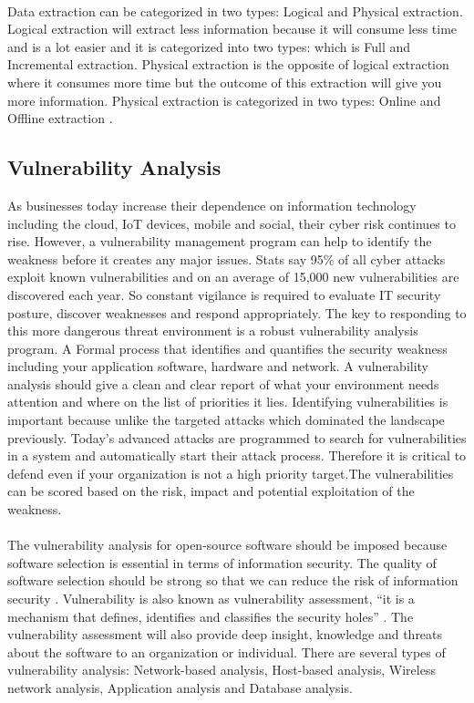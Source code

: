 \paragraph{}
Data extraction can be categorized in two types: Logical and Physical extraction. Logical extraction will extract less information because it will consume less time and is a lot easier and it is categorized into two types: which is Full and Incremental extraction. Physical extraction is the opposite of logical extraction where it consumes more time but the outcome of this extraction will give you more information. Physical extraction is categorized in two types: Online and Offline extraction \cite{DataWH}.
%
\subsection{Vulnerability Analysis}
As businesses today increase their dependence on information technology including the cloud, IoT devices, mobile and social, their cyber risk continues to rise. However, a vulnerability management program can help to identify the weakness before it creates any major issues. Stats say 95\% of all cyber attacks exploit known vulnerabilities and on an average of 15,000 new vulnerabilities are discovered each year. So constant vigilance is required to evaluate IT security posture, discover weaknesses and respond appropriately. The key to responding to this more dangerous threat environment is a robust vulnerability analysis program. A Formal process that identifies and quantifies the security weakness including your application software, hardware and network. A vulnerability analysis should give a clean and clear report of what your environment needs attention and where on the list of priorities it lies. Identifying vulnerabilities is important  because unlike the targeted attacks which dominated the landscape previously. Today’s advanced attacks are programmed to search for vulnerabilities in a system and automatically start their attack process. Therefore it is critical to defend even if your organization is not a high priority target.The vulnerabilities can be scored based on the risk, impact and potential exploitation of the weakness.
\paragraph{}
The vulnerability analysis for open-source software should be imposed because software selection is essential in terms of information security. The quality of software selection should be strong so that we can reduce the risk of information security \cite{KeJaSa2005}. Vulnerability is also known as vulnerability assessment, “it is a mechanism that defines, identifies and classifies the security holes” \cite{KeJaSa2005}. The vulnerability assessment will also provide deep insight, knowledge and threats about the software to an organization or individual. There are several types of vulnerability analysis: Network-based analysis, Host-based analysis, Wireless network analysis, Application analysis and Database analysis.
